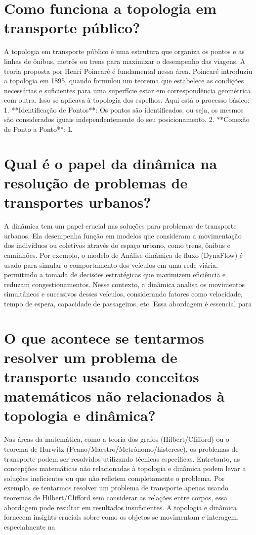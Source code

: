 \documentclass[11pt,a4paper]{article}
\begin{document}
\section{Como funciona a topologia em transporte público?}
A topologia em transporte público é uma estrutura que organiza os pontos e as linhas de ônibus, metrôs ou trens para maximizar o desempenho das viagens. A teoria proposta por Henri Poincaré é fundamental nessa área. Poincaré introduziu a topologia em 1895, quando formulou um teorema que estabelece as condições necessárias e suficientes para uma superfície estar em correspondência geométrica com outra. Isso se aplicava à topologia dos espelhos. Aqui está o processo básico: 1. **Identificação de Pontos**: Os pontos são identificados, ou seja, os mesmos são considerados iguais independentemente do seu posicionamento. 2. **Conexão de Ponto a Ponto**: L

\section{Qual é o papel da dinâmica na resolução de problemas de transportes urbanos?}
A dinâmica tem um papel crucial nas soluções para problemas de transporte urbanos. Ela desempenha função em modelos que consideram a movimentação dos indivíduos ou coletivos através do espaço urbano, como trens, ônibus e caminhões. Por exemplo, o modelo de Análise dinâmica de fluxo (DynaFlow) é usado para simular o comportamento dos veículos em uma rede viária, permitindo a tomada de decisões estratégicas que maximizem eficiência e reduzam congestionamentos. Nesse contexto, a dinâmica analisa os movimentos simultâneos e sucessivos desses veículos, considerando fatores como velocidade, tempo de espera, capacidade de passageiros, etc. Essa abordagem é essencial para

\section{O que acontece se tentarmos resolver um problema de transporte usando conceitos matemáticos não relacionados à topologia e dinâmica?}
Nas áreas da matemática, como a teoria dos grafos (Hilbert/Clifford) ou o teorema de Hurwitz (Peano/Maestro/Metrónomo/histerese), os problemas de transporte podem ser resolvidos utilizando técnicas específicas. Entretanto, as concepções matemáticas não relacionadas à topologia e dinâmica podem levar a soluções ineficientes ou que não refletem completamente o problema. Por exemplo, se tentarmos resolver um problema de transporte apenas usando teoremas de Hilbert/Clifford sem considerar as relações entre corpos, essa abordagem pode resultar em resultados insuficientes. A topologia e dinâmica fornecem insights cruciais sobre como os objetos se movimentam e interagem, especialmente na
\end{document}
